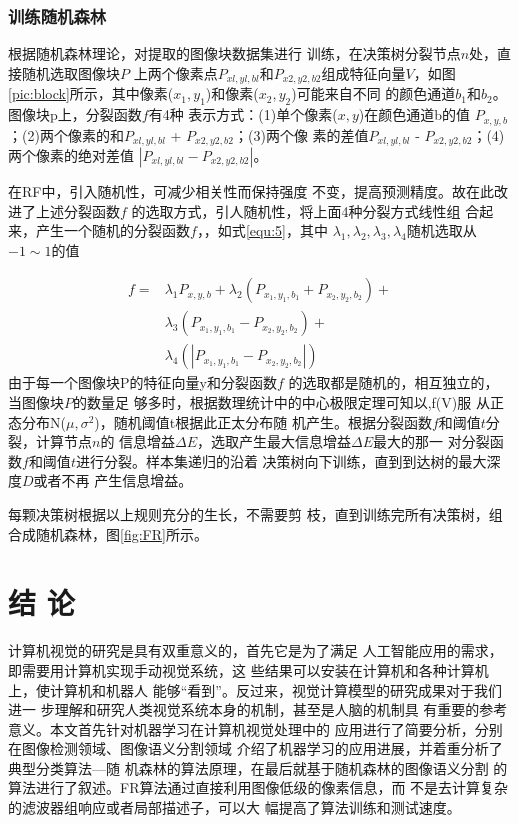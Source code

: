 \documentclass[UTF8,a4paper,10pt,nocolorlinks]{ctexart}
\begin{document}
\begin{multicols}{2}
\subsubsection{训练随机森林} 
根据随机森林理论，对提取的图像块数据集进行
训练，在决策树分裂节点$n$处，直接随机选取图像块$P$
上两个像素点$P_{xl,yl,bl}$和$P_{x2,y2,b2}$组成特征向量$V$，如图\ref{pic:block}所示，其中像素($x_1, y_1$)和像素($x_2, y_2$)可能来自不同
的颜色通道$b_{1}$和$b_{2}$。图像块p上，分裂函数$f$有4种
表示方式：(1)单个像素($x, y$)在颜色通道b的值
$P_{x,y,b}$；(2)两个像素的和$P_{xl,yl,bl}$ + $P_{x2,y2,b2}$；(3)两个像
素的差值$P_{xl,yl,bl}$ - $P_{x2,y2,b2}$；(4)两个像素的绝对差值
$|P_{xl,yl,bl} - P_{x2,y2,b2}|$。\par
在RF中，引入随机性，可减少相关性而保持强度
不变，提高预测精度。故在此改进了上述分裂函数$f$
的选取方式，引人随机性，将上面4种分裂方式线性组
合起来，产生一个随机的分裂函数$f$，，如式\ref{equ:5}，其中
$\lambda_{1}, \lambda_{2}, \lambda_{3}, \lambda_{4}$随机选取从$-1 \sim 1$的值

\begin{align}
    f = & \lambda_1 P_{x, y, b} + \lambda_2 (P_{x_1, y_1, b_1} + P_{x_2, y_2, b_2}) +  \nonumber \\ 
        & \lambda_3 (P_{x_1, y_1, b_1} - P_{x_2, y_2, b_2}) + \nonumber \\
        & \lambda_4 ( | P_{x_1, y_1, b_1} - P_{x_2, y_2, b_2} | )
    \label{equ:5}
\end{align}
    由于每一个图像块P的特征向量y和分裂函数$f$
的选取都是随机的，相互独立的，当图像块$P$的数量足
够多时，根据数理统计中的中心极限定理可知以,f(V)服
从正态分布N($\mu, \sigma^2$)，随机阈值t根据此正太分布随
机产生。根据分裂函数$f$和阈值$t$分裂，计算节点$n$的
信息增益$\Delta E$，选取产生最大信息增益$\Delta E$最大的那一
对分裂函数$f$和阈值$t$进行分裂。样本集递归的沿着
决策树向下训练，直到到达树的最大深度$D$或者不再
产生信息增益。\par
每颗决策树根据以上规则充分的生长，不需要剪
枝，直到训练完所有决策树，组合成随机森林，图\ref{fig:FR}所示。
    \section{结 论}
    计算机视觉的研究是具有双重意义的，首先它是为了满足
    人工智能应用的需求，即需要用计算机实现手动视觉系统，这
    些结果可以安装在计算机和各种计算机上，使计算机和机器人
    能够“看到”。反过来，视觉计算模型的研究成果对于我们进一
    步理解和研究人类视觉系统本身的机制，甚至是人脑的机制具
    有重要的参考意义。本文首先针对机器学习在计算机视觉处理中的
    应用进行了简要分析，分别在图像检测领域、图像语义分割领域
    介绍了机器学习的应用进展，并着重分析了典型分类算法—随
    机森林的算法原理，在最后就基于随机森林的图像语义分割
    的算法进行了叙述。FR算法通过直接利用图像低级的像素信息，而
    不是去计算复杂的滤波器组响应或者局部描述子，可以大
    幅提高了算法训练和测试速度。
    \end{multicols}
    \clearpage %
\end{document}
